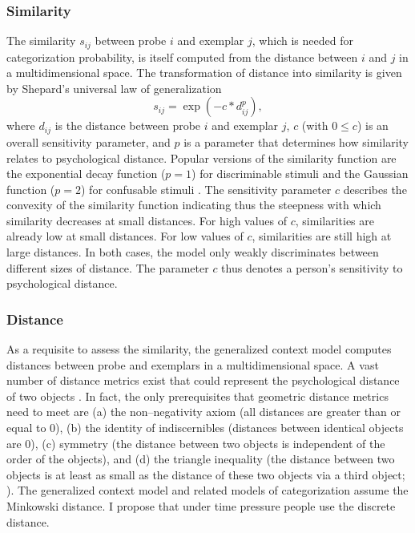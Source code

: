 \documentclass[a4paper,man,natbib]{apa6}
\begin{document}
\subsubsection{Similarity}
The similarity $s_{ij}$ between probe $i$ and exemplar $j$, which is needed for categorization probability, is itself computed from the distance between $i$ and $j$ in a multidimensional space. The transformation of distance into similarity is given by Shepard's universal law of generalization \citep{shepard1987toward}
\begin{equation}
s_{ij} = \exp\left(-c*d_{ij}^p\right),
\label{eq:similarity}
\end{equation}
where $d_{ij}$ is the distance between probe $i$ and exemplar $j$, $c$ (with $0 \leq c$) is an overall sensitivity parameter, and $p$ is a parameter that determines how similarity relates to psychological distance. Popular versions of the similarity function are the exponential decay function ($p = 1$) for discriminable stimuli and the Gaussian function ($p = 2$) for confusable stimuli \citep{ennis1988confusable, nosofsky1985luce}. The sensitivity parameter $c$ describes the convexity of the similarity function indicating thus the steepness with which similarity decreases at small distances. For high values of $c$, similarities are already low at small distances. For low values of $c$, similarities are still high at large distances. In both cases, the model only weakly discriminates between different sizes of distance. The parameter $c$ thus denotes a person's sensitivity to psychological distance.

\subsubsection{Distance}
As a requisite to assess the similarity, the generalized context model computes distances between probe and exemplars in a multidimensional space. A vast number of distance metrics exist that could represent the psychological distance of two objects \citep{deza2009encyclopedia}. In fact, the only prerequisites that geometric distance metrics need to meet are (a) the non--negativity axiom (all distances are greater than or equal to 0), (b) the identity of indiscernibles (distances between identical objects are 0), (c) symmetry (the distance between two objects is independent of the order of the objects), and (d) the triangle inequality (the distance between two objects is at least as small as the distance of these two objects via a third object; \citealp{restle1959metric}). The generalized context model and related models of categorization assume the Minkowski distance. I propose that under time pressure people use the discrete distance.
\end{document}
